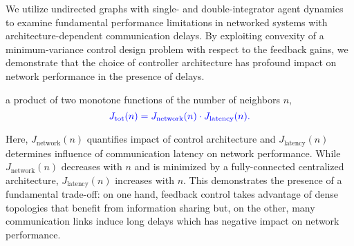 

\mode
\newpage
\fi
{}
{We utilize undirected graphs with %
single- and double-integrator agent dynamics to examine fundamental performance limitations in networked systems with architecture-dependent communication delays. 
By exploiting convexity of a minimum-variance control design problem with respect to the feedback gains}, %
we demonstrate that the choice of controller architecture
has profound impact on network performance in the presence of delays. 


	\iffalse
	a product of two monotone functions of the number of neighbors $ n $,
\begin{equation}\label{eq:trade-off-mul}
	{\color{blue} J_{\textrm{tot}}(n) = J_{\textrm{network}}(n)\cdot J_{\textrm{latency}}(n).}
\end{equation}

Here, 
$ J_{\textrm{network}}(n) $ quantifies impact of control architecture and
$ J_{\textrm{latency}}(n) $ determines influence of communication latency on network performance.
While $ J_{\textrm{network}}(n) $ decreases with $ n $ and is minimized by a fully-connected centralized architecture,
$ J_{\textrm{latency}}(n) $ increases with $n$.
This demonstrates the presence of a fundamental trade-off:
on one hand, 
feedback control takes advantage of dense topologies that benefit from information sharing but,
on the other, 
many communication links induce long delays which has negative impact on network performance.

